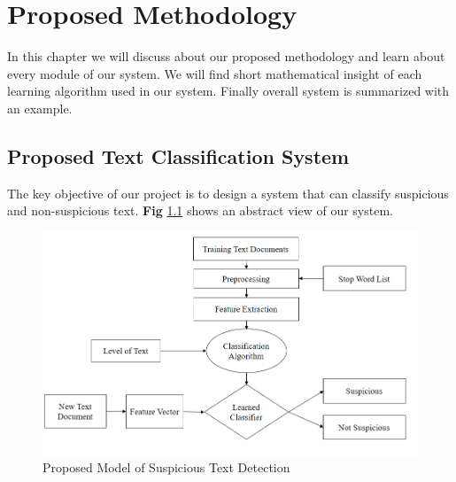 \chapter{Proposed Methodology}
\thispagestyle{empty}
In this chapter we will discuss about our proposed methodology and learn about every module of our system. We will find short mathematical insight of each learning algorithm used in our system. Finally overall system is summarized with an example.
\section{Proposed Text Classification System}
The key objective of our project is to design a system that can classify suspicious and non-suspicious text. \textbf{Fig} \ref{fig:proposed_model} shows an abstract view of our system.
\vspace{0.5cm}
\begin{figure}[h!]
\centering
  \includegraphics[scale=0.6]{Figures/proposed_model.PNG}
  \caption{Proposed Model of Suspicious Text Detection}
  \label{fig:proposed_model}
\end{figure}
 
